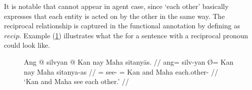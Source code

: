 It is notable that  cannot appear in agent case, since
`each other' basically expresses that each entity is acted on by the other in
the same way. The reciprocal relationship is captured in the functional
annotation by defining \Prontype{} as $recip$. Example 
(\ref{ex:eachotheravm}) illustrates what the \Avm{} for a sentence with a
reciprocal pronoun could look like.

\begin{figure}
\ex\label{ex:eachotheravm}
\begingl
	\gla Ang @ silvyan {} @ Kan nay Maha sitanyās. //
	\glb ang= silv-yan Ø= Kan nay Maha sitanya-as //
	\glc \AgtT{}= see-\TplM{} \Top{}= Kan and Maha each.other-\Parg{} //
	\glft `Kan and Maha see each other.' //
\endgl\medskip


\xe
\end{figure}

